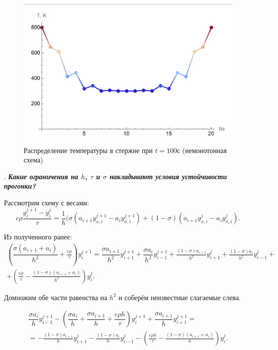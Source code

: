 \documentclass[12pt, a4paper]{article}
\newcounter{mycounter}
\newcommand{\quastion}[1]{%
	\stepcounter{mycounter}%
	\textbf{\themycounter}.  %
	\textbf{\textit{#1}}
	
}
\begin{document}
 \begin{figure}[H]
	\centering	
	\includegraphics[width=1\textwidth]{nomonotExample}
	\caption{Распределение температуры в стержне при \mbox{$t=100$с} (немонотонная схема)}
\end{figure}

	\clearpage %
	\quastion{Какие ограничения на $h$, $\tau$ и $\sigma$ накладывают условия устойчивости прогонки?}
	
		Рассмотрим схему с весами:
	\[
	c \rho \frac{y^{j+1}_i - y^{j}_i}{\tau} = \frac{1}{h} (\sigma(a_{i+1} y^{j+1}_{x,i} - a_{i} y^{j+1}_{\bar{x},i}) + (1-\sigma)(a_{i+1} y^{j}_{x,i} - a_{i} y^{j}_{\bar{x},i}).
	\]
	
	Из полученного ранее:
	\begin{multline*}
		(\dfrac{\sigma(a_{i+1}+a_i)}{h^2}+\frac{c \rho}{\tau})y_i^{j+1} = \dfrac{\sigma a_{i+1}}{h^2}y_{i+1}^{j+1} + \dfrac{\sigma a_{i}}{h^2}y_{i-1}^{j+1} + \frac{(1-\sigma)a_{i+1}}{h^2}y_{i+1}^j + \frac{(1-\sigma)a_{i}}{h^2}y_{i-1}^j +\\ 
		+(\frac{c \rho}{\tau} - \frac{(1-\sigma)(a_{i+1}+a_i)}{h^2})y_i^j.
	\end{multline*}
	
	Домножим обе части равенства на $h^2$ и соберём неизвестные слагаемые слева.
	
	\begin{multline*}
	\dfrac{\sigma a_i}{h} y_{i-1}^{j+1} - (\dfrac{\sigma a_i}{h} + \dfrac{\sigma a_{i+1}}{h}+\dfrac{c \rho h}{\tau})y_i^{j+1} + \dfrac{\sigma a_{i+1}}{h} y_{i+1}^{j+1} = \\
	= - \frac{(1-\sigma)a_{i+1}}{h}y_{i+1}^j - \frac{(1-\sigma)a_{i}}{h}y_{i-1}^j -
	(\frac{c \rho h}{\tau} - \frac{(1-\sigma)(a_{i+1}+a_i)}{h})y_i^j.
\end{multline*}
	
\end{document}
